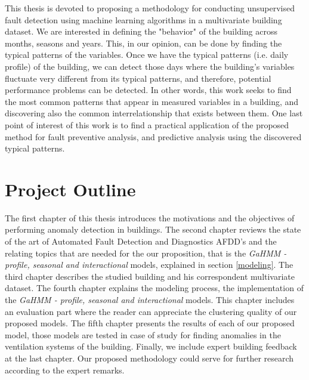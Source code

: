 This thesis is devoted to proposing a methodology for conducting unsupervised fault detection using machine learning algorithms in a multivariate building dataset. We are interested in defining the "behavior" of the building across months, seasons and years. This, in our opinion, can be done by finding the typical patterns of the variables. Once we have the typical patterns (i.e. daily profile) of the building, we can detect those days where the building’s variables fluctuate very different from its typical patterns, and therefore, potential performance problems can be detected. 
In other words, this work seeks to find the most common patterns that appear in measured variables in a building, and discovering also the common interrelationship that exists between them. One last point of interest of this work is to find a practical application of the proposed method for fault preventive analysis, and predictive analysis using the discovered typical patterns.
 
 
\section{Project Outline}

The first chapter of this thesis introduces the motivations and the objectives of performing anomaly detection in buildings. The second chapter reviews the state of the art of Automated Fault Detection and Diagnostics AFDD's and the relating topics that are needed for the our proposition, that is the \textit{GaHMM - profile, seasonal and interactional} models, explained in section \ref{modeling}. The third chapter describes the studied building and his correspondent multivariate dataset. The fourth chapter explains the modeling process, the implementation of the \textit{GaHMM - profile, seasonal and interactional} models. This chapter includes an evaluation part where the reader can appreciate the clustering quality of our proposed models. The fifth chapter presents the results of each of our proposed model, those models are tested in case of study for finding anomalies in the ventilation systems of the building. Finally, we include expert building feedback at the last chapter. Our proposed methodology could serve for further research according to the expert remarks.
